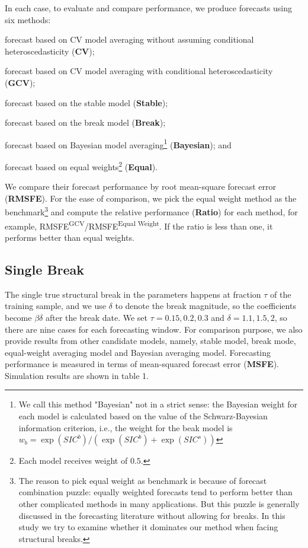 \documentclass[a4paper,12pt]{article}
\begin{document}
In each case, to evaluate and compare performance, we produce forecasts using six methods:
\begin{inparaenum}[(i)]
\item forecast based on CV model averaging without assuming conditional heteroscedasticity (\textbf{CV});
\item forecast based on CV model averaging with conditional heteroscedasticity (\textbf{GCV});
\item forecast based on the stable model (\textbf{Stable});
\item forecast based on the break model (\textbf{Break});
\item forecast based on Bayesian model averaging\footnote{We call this method "Bayesian" not in a strict sense: the Bayesian weight for each model is calculated based on the value of the Schwarz-Bayesian information criterion, i.e., the weight for the beak model is $w_{b} = \exp{(SIC^{b})}/(\exp{(SIC^{b})} + \exp{(SIC^{s})})$} (\textbf{Bayesian}); and
\item forecast based on equal weights\footnote{Each model receives weight of $0.5$.} (\textbf{Equal}).
\end{inparaenum}
We compare their forecast performance by root mean-square forecast error (\textbf{RMSFE}). For the ease of comparison, we pick the equal weight method as the benchmark\footnote{The reason to pick equal weight as benchmark is because of forecast combination puzzle: equally weighted forecasts tend to perform better than other complicated methods in many applications. But this puzzle is generally discussed in the forecasting literature without allowing for breaks. In this study we try to examine whether it dominates our method when facing structural breaks.} and compute the relative performance (\textbf{Ratio}) for each method, for example, RMSFE\textsuperscript{GCV}/RMSFE\textsuperscript{Equal Weight}. If the ratio is less than one, it performs better than equal weights.
\subsection{Single Break}
The single true structural break in the parameters happens at fraction $\tau$ of the training sample, and we use $\delta$ to denote the break magnitude, so the coefficients become $\beta \delta$ after the break date. We set $\tau = 0.15, 0.2, 0.3$ and $\delta = 1.1, 1.5, 2$, so there are nine cases for each forecasting window. For comparison purpose, we also provide results from other candidate models, namely, stable model, break mode, equal-weight averaging model and Bayesian averaging model. Forecasting performance is measured in terms of mean-squared forecast error (\textbf{MSFE}). Simulation results are shown in table 1.
\end{document}
